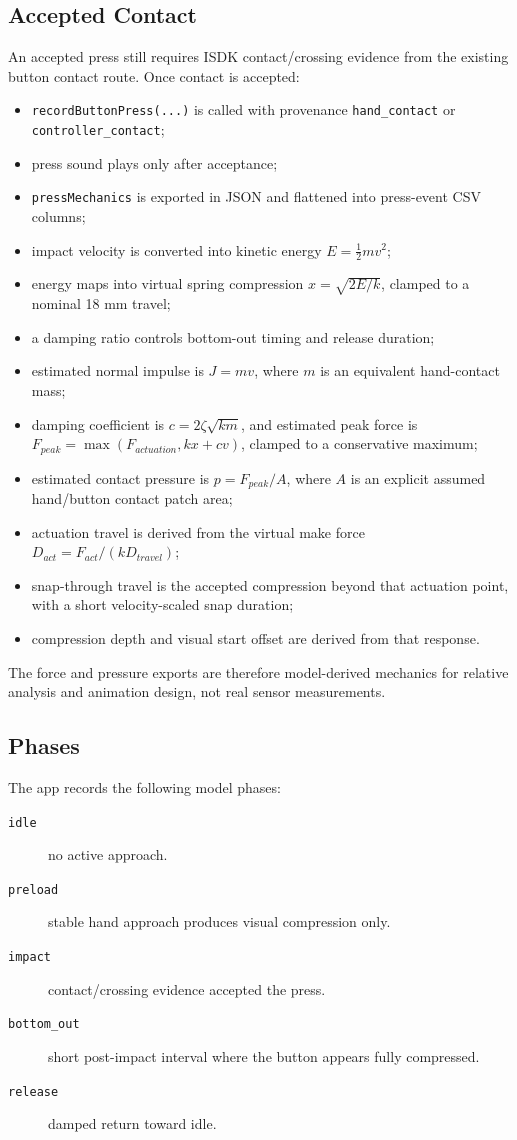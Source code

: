 \documentclass[11pt]{article}
\begin{document}
\subsection{Accepted Contact}
An accepted press still requires ISDK contact/crossing evidence from the existing button contact route. Once contact is accepted:
\begin{itemize}
  \item \texttt{recordButtonPress(...)} is called with provenance \texttt{hand\_contact} or \texttt{controller\_contact};
  \item press sound plays only after acceptance;
  \item \texttt{pressMechanics} is exported in JSON and flattened into press-event CSV columns;
  \item impact velocity is converted into kinetic energy \(E=\frac{1}{2}mv^2\);
  \item energy maps into virtual spring compression \(x=\sqrt{2E/k}\), clamped to a nominal 18 mm travel;
  \item a damping ratio controls bottom-out timing and release duration;
  \item estimated normal impulse is \(J=mv\), where \(m\) is an equivalent hand-contact mass;
  \item damping coefficient is \(c=2\zeta\sqrt{km}\), and estimated peak force is \(F_{peak}=\max(F_{actuation}, kx + cv)\), clamped to a conservative maximum;
  \item estimated contact pressure is \(p=F_{peak}/A\), where \(A\) is an explicit assumed hand/button contact patch area;
  \item actuation travel is derived from the virtual make force \(D_{act}=F_{act}/(kD_{travel})\);
  \item snap-through travel is the accepted compression beyond that actuation point, with a short velocity-scaled snap duration;
  \item compression depth and visual start offset are derived from that response.
\end{itemize}
The force and pressure exports are therefore model-derived mechanics for relative analysis and animation design, not real sensor measurements.

\subsection{Phases}
The app records the following model phases:
\begin{description}
  \item[\texttt{idle}] no active approach.
  \item[\texttt{preload}] stable hand approach produces visual compression only.
  \item[\texttt{impact}] contact/crossing evidence accepted the press.
  \item[\texttt{bottom\_out}] short post-impact interval where the button appears fully compressed.
  \item[\texttt{release}] damped return toward idle.
\end{description}
\end{document}
